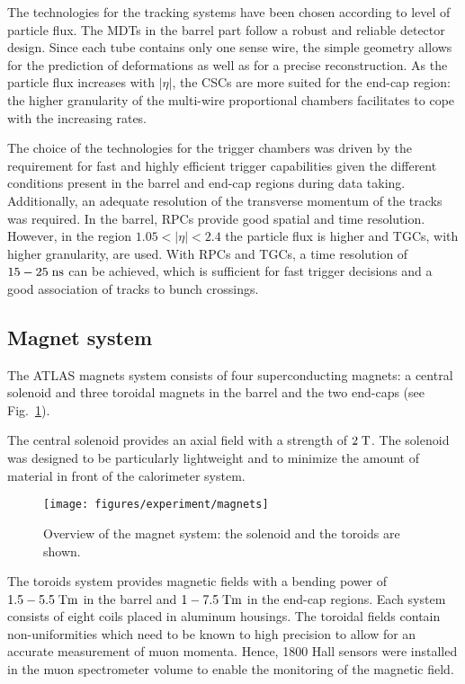 The technologies for the tracking systems have been chosen according to
level of particle flux.
The MDTs in the barrel part follow a robust and reliable detector design.
Since each tube contains only one sense wire, the simple geometry
allows for the prediction of deformations as well as for a precise
reconstruction.
As the particle flux increases with $|\eta|$, the CSCs are more suited
for the end-cap region: the higher granularity of the multi-wire
proportional chambers facilitates to cope with the increasing rates. 

The choice of the technologies for the trigger chambers was driven 
by the requirement for fast and highly efficient trigger capabilities
given the different conditions present in the barrel and end-cap
regions during data taking. 
Additionally, an adequate resolution of the transverse momentum of the
tracks was required. 
In the barrel, RPCs provide good spatial and time resolution.
However, in the region \mbox{$1.05 < |\eta| < 2.4$}  the particle flux
is higher and TGCs, with higher granularity, are used.
With RPCs and TGCs, a time resolution of \mbox{$15 - 25 \; \mathrm{ns}$} can be
achieved, 
which is sufficient for fast trigger decisions and a good association of
tracks to bunch crossings.

\subsection{Magnet system}
\label{sec:magnets}

The ATLAS magnets system consists of four superconducting
magnets: a central solenoid and three toroidal magnets in the barrel and the
two end-caps (see Fig.~\ref{fig:magnets}).

The central solenoid provides an axial field with a strength of \mbox{$2 \; \mathrm{T}$}.
The solenoid was designed to be particularly lightweight and to
minimize the amount of material in front of the calorimeter system.

\begin{figure}[ht]
\begin{center}
\texttt{[image: figures/experiment/magnets]}
\caption[Overview of the magnet system]{
  Overview of the magnet system:
  the solenoid and the toroids are shown.}
\label{fig:magnets}
\end{center}
\end{figure}

The toroids system provides magnetic fields with a bending power
of \mbox{$1.5 - 5.5 \; \mathrm{Tm}$} in the barrel and \mbox{$1 - 7.5 \; \mathrm{Tm}$} in the end-cap regions.
Each system consists of eight coils placed in aluminum housings.
The toroidal fields contain non-uniformities which need to be known to
high precision to allow for an accurate measurement of muon momenta.
Hence, 1800 Hall sensors were installed in the muon spectrometer 
volume to enable the monitoring of the magnetic field.


